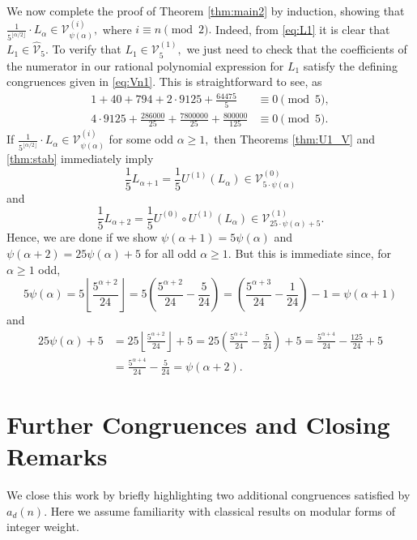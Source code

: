 \documentclass[12pt, reqno]{amsart}
\theoremstyle{definition}
\theoremstyle{remark}
\begin{document}
We now complete the proof of Theorem \ref{thm:main2} by induction, showing that $\frac{1}{{5^{\lfloor \alpha/2\rfloor}}} \cdot L_{\alpha} \in \mathcal{V}_{\psi(\alpha)}^{(i)},$ where $i \equiv n \pmod{2}.$ Indeed, from \eqref{eq:L1} it is clear that $L_1 \in \hat{\mathcal{V}}_5.$ To verify that $L_1 \in \mathcal{V}_5^{(1)},$ we just need to check that the coefficients of the numerator in our rational polynomial expression for $L_1$ satisfy the defining congruences given in \eqref{eq:Vn1}. This is straightforward to see, as 
\begin{align*}
1 + 40 + 794 + 2\cdot 9125 + \frac{64475}{5}  &\equiv 0 \pmod{5}, \\
4\cdot 9125+ \frac{286000}{25} + \frac{7800000}{25} + \frac{800000}{125} &\equiv 0 \pmod{5}. 
\end{align*}
If $\frac{1}{{5^{\lfloor \alpha/2\rfloor}}} \cdot L_{\alpha} \in \mathcal{V}_{\psi(\alpha)}^{(i)}$ for some odd $\alpha \geq 1,$ then Theorems \ref{thm:U1_V} and \ref{thm:stab} immediately imply 
\[\frac{1}{5} L_{\alpha+1} = \frac{1}{5} U^{(1)}(L_\alpha) \in \mathcal{V}_{5\cdot \psi(\alpha)}^{(0)}\]
and
\[\frac{1}{5} L_{\alpha+2} = \frac{1}{5} U^{(0)} \circ U^{(1)} (L_\alpha) \in \mathcal{V}_{25\cdot \psi(\alpha)+5}^{(1)}.\]
Hence, we are done if we show $\psi(\alpha+1) = 5 \psi(\alpha)$ and $\psi(\alpha+2) = 25\psi(\alpha)+5$ for all odd $\alpha \geq 1.$ But this is immediate since, for $\alpha \geq 1$ odd, 
\[5\psi(\alpha) = 5\left\lfloor \frac{5^{\alpha+2}}{24} \right\rfloor= 5\left(\frac{5^{\alpha+2}}{24} - \frac{5}{24}\right) = \left(\frac{5^{\alpha+3}}{24} - \frac{1}{24}\right) -1 = \psi(\alpha+1)\]
and
\begin{align*}
25\psi(\alpha)+5 &= 25\left\lfloor \frac{5^{\alpha+2}}{24} \right\rfloor + 5 = 25\left(\frac{5^{\alpha+2}}{24} - \frac{5}{24}\right)+5 = \frac{5^{\alpha+4}}{24} - \frac{125}{24} + 5 \\
&= \frac{5^{\alpha+4}}{24} - \frac{5}{24} = \psi(\alpha+2).
\end{align*}


\section{Further Congruences and Closing Remarks}\label{sec:closing}
We close this work by briefly highlighting two additional congruences satisfied by $a_d(n)$. Here we assume familiarity with classical results on modular forms of integer weight. 
\end{document}
